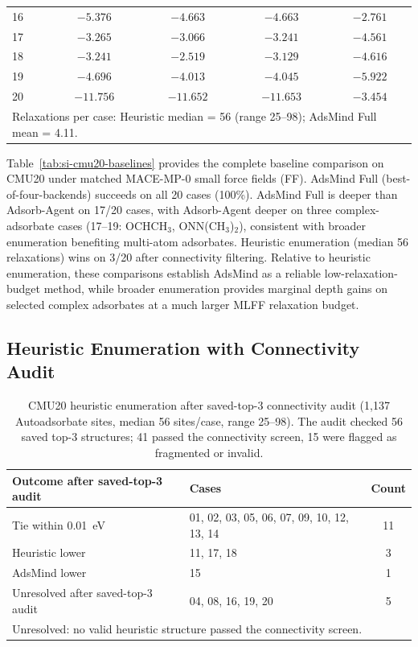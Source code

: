 \documentclass[%
 preprint,
 superscriptaddress,
 amsmath,amssymb,
 aps,
 prb,
 floatfix,
]{revtex4-2}
\begin{document}
\begin{table}[ht]
\begin{tabular}{lcccc}
16 & $-5.376$ & $-4.663$ & $-4.663$ & $-2.761$ \\
17 & $-3.265$ & $-3.066$ & $-3.241$ & $-4.561$ \\
18 & $-3.241$ & $-2.519$ & $-3.129$ & $-4.616$ \\
19 & $-4.696$ & $-4.013$ & $-4.045$ & $-5.922$ \\
20 & $-11.756$ & $-11.652$ & $-11.653$ & $-3.454$ \\
\midrule
\multicolumn{5}{l}{Relaxations per case: Heuristic median = 56 (range 25--98); AdsMind Full mean = 4.11.} \\
\bottomrule
\end{tabular}%
\end{table}

Table~\ref{tab:si-cmu20-baselines} provides the complete baseline comparison on CMU20 under matched MACE-MP-0 small force fields (FF). AdsMind Full (best-of-four-backends) succeeds on all 20 cases (100\%). AdsMind Full is deeper than Adsorb-Agent on 17/20 cases, with Adsorb-Agent deeper on three complex-adsorbate cases (17--19: OCHCH$_3$, ONN(CH$_3$)$_2$), consistent with broader enumeration benefiting multi-atom adsorbates. Heuristic enumeration (median 56 relaxations) wins on 3/20 after connectivity filtering. Relative to heuristic enumeration, these comparisons establish AdsMind as a reliable low-relaxation-budget method, while broader enumeration provides marginal depth gains on selected complex adsorbates at a much larger MLFF relaxation budget.

\subsection{Heuristic Enumeration with Connectivity Audit}

\begin{table}[ht]
\centering
\caption{CMU20 heuristic enumeration after saved-top-3 connectivity audit (1{,}137 Autoadsorbate sites, median 56 sites/case, range 25--98). The audit checked 56 saved top-3 structures; 41 passed the connectivity screen, 15 were flagged as fragmented or invalid.}
\label{tab:si-cmu20-heuristic}
\begin{tabular}{llc}
\toprule
Outcome after saved-top-3 audit & Cases & Count \\
\midrule
Tie within 0.01~eV & 01, 02, 03, 05, 06, 07, 09, 10, 12, 13, 14 & 11 \\
Heuristic lower & 11, 17, 18 & 3 \\
AdsMind lower & 15 & 1 \\
Unresolved after saved-top-3 audit & 04, 08, 16, 19, 20 & 5 \\
\midrule
\multicolumn{3}{l}{Unresolved: no valid heuristic structure passed the connectivity screen.} \\
\bottomrule
\end{tabular}%
\end{table}
\end{document}
